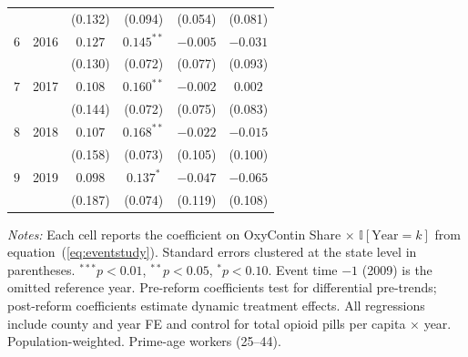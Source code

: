 \begin{table}[t]
\begin{threeparttable}
\begin{tabular}{lccccc}
 & & (0.132) & (0.094) & (0.054) & (0.081) \\
$6$ & 2016 & $0.127$ & $0.145^{**}$ & $-0.005$ & $-0.031$ \\
 & & (0.130) & (0.072) & (0.077) & (0.093) \\
$7$ & 2017 & $0.108$ & $0.160^{**}$ & $-0.002$ & $0.002$ \\
 & & (0.144) & (0.072) & (0.075) & (0.083) \\
$8$ & 2018 & $0.107$ & $0.168^{**}$ & $-0.022$ & $-0.015$ \\
 & & (0.158) & (0.073) & (0.105) & (0.100) \\
$9$ & 2019 & $0.098$ & $0.137^{*}$ & $-0.047$ & $-0.065$ \\
 & & (0.187) & (0.074) & (0.119) & (0.108) \\
\bottomrule
\end{tabular}
\begin{tablenotes}[flushleft]
\footnotesize
\item \textit{Notes:} Each cell reports the coefficient on OxyContin Share $\times$ $\mathbb{I}[\text{Year} = k]$ from equation~(\ref{eq:eventstudy}). Standard errors clustered at the state level in parentheses. $^{***}p<0.01$, $^{**}p<0.05$, $^{*}p<0.10$. Event time $-1$ (2009) is the omitted reference year. Pre-reform coefficients test for differential pre-trends; post-reform coefficients estimate dynamic treatment effects. All regressions include county and year FE and control for total opioid pills per capita $\times$ year. Population-weighted. Prime-age workers (25--44).
\end{tablenotes}
\end{threeparttable}
\end{table}
